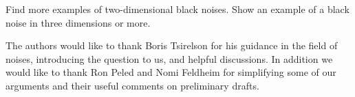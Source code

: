 {\begin{openproblem}
  Find more examples of two-dimensional black noises.  Show an example
  of a black noise in three dimensions or more.
\end{openproblem}


The authors would like to thank Boris Tsirelson for his guidance in
the field of noises, introducing the question to us, and helpful
discussions.  In addition we would like to thank Ron Peled and Nomi
Feldheim for simplifying some of our arguments and their useful
comments on preliminary drafts.
}
